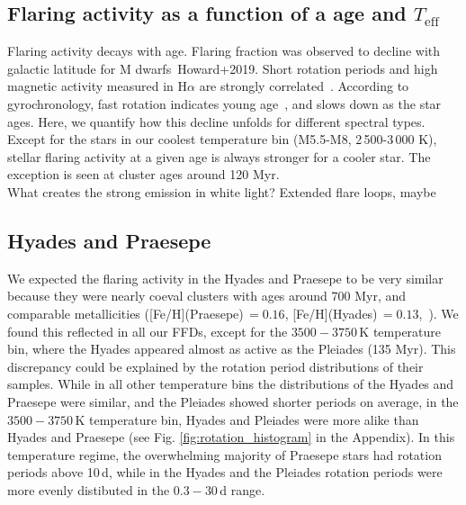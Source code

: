 \documentclass{aa}
\begin{document}
\subsection{Flaring activity as a function of a age and $T_\mathrm{eff}$}
Flaring activity decays with age. Flaring fraction was observed to decline with galactic latitude for M dwarfs~\citep{hilton_dwarf_2010}Howard+2019. Short rotation periods and high magnetic activity measured in H$\alpha$ are strongly correlated~\citep{west_magneticrotationage_2015}. According to gyrochronology, fast rotation indicates young age~\citep{barnes_rotational_2003}, and slows down as the star ages. Here, we quantify how this decline unfolds for different spectral types. Except for the stars in our coolest temperature bin (M5.5-M8, 2\,500-3\,000 K), stellar flaring activity at a given age is always stronger for a cooler star. The exception is seen at cluster ages around 120 Myr.
\\
What creates the strong emission in white light? Extended flare loops, maybe~\citep{heinzel_flareloops_2018}
\subsection{Hyades and Praesepe}
We expected the flaring activity in the Hyades and Praesepe to be very similar because they were nearly coeval clusters with ages around 700 Myr, and comparable metallicities ([Fe/H](Praesepe)\,$=0.16$, [Fe/H](Hyades)\,$=0.13$,~\citealt{netopil_metallicities_2016}). We found this reflected in all our FFDs, except for the $3500-3750$\,K temperature bin, where the Hyades appeared almost as active as the Pleiades (135 Myr). This discrepancy could be explained by the rotation period distributions of their samples. While in all other temperature bins the distributions of the Hyades and Praesepe were similar, and the Pleiades showed shorter periods on average, in the $3500-3750$\,K temperature bin, Hyades and Pleiades were more alike than Hyades and Praesepe (see Fig. \ref{fig:rotation_histogram} in the Appendix). In this temperature regime, the overwhelming majority of Praesepe stars had rotation periods above 10\,d, while in the Hyades and the Pleiades rotation periods were more evenly distibuted in the $0.3-30$\,d range.
\end{document}
